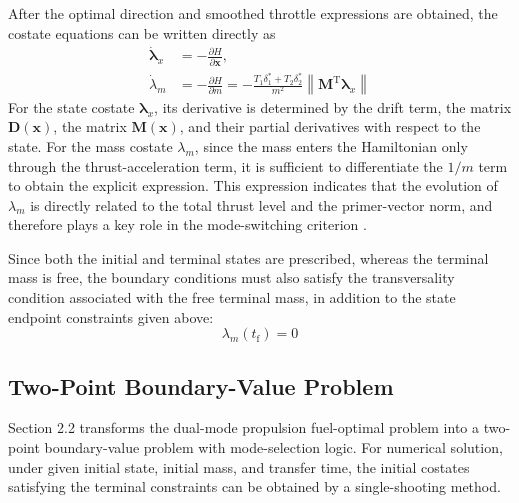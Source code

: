 ﻿\documentclass{IEEEtaes}
\begin{document}
After the optimal direction and smoothed throttle expressions are obtained, the costate equations can be written directly as
\begin{equation}
\begin{aligned}
\dot{\bm{\lambda}}_x&=-\frac{\partial H}{\partial \bm{x}},\\
\dot{\lambda}_m&=-\frac{\partial H}{\partial m}
=-\frac{T_1\delta_1^{*}+T_2\delta_2^{*}}{m^2}\left\|\bm{M}^{\mathrm{T}}\bm{\lambda}_x\right\|
\end{aligned}
\end{equation}
For the state costate $\bm{\lambda}_x$, its derivative is determined by the drift term, the matrix $\bm{D}(\bm{x})$, the matrix $\bm{M}(\bm{x})$, and their partial derivatives with respect to the state. For the mass costate $\lambda_m$, since the mass enters the Hamiltonian only through the thrust-acceleration term, it is sufficient to differentiate the $1/m$ term to obtain the explicit expression. This expression indicates that the evolution of $\lambda_m$ is directly related to the total thrust level and the primer-vector norm, and therefore plays a key role in the mode-switching criterion \cite{chi2022,russell2007,cline2024a}.

Since both the initial and terminal states are prescribed, whereas the terminal mass is free, the boundary conditions must also satisfy the transversality condition associated with the free terminal mass, in addition to the state endpoint constraints given above:
\begin{equation}
\lambda_m(t_{\mathrm{f}})=0
\end{equation}

\subsection{Two-Point Boundary-Value Problem}
Section 2.2 transforms the dual-mode propulsion fuel-optimal problem into a two-point boundary-value problem with mode-selection logic. For numerical solution, under given initial state, initial mass, and transfer time, the initial costates satisfying the terminal constraints can be obtained by a single-shooting method.
\end{document}
